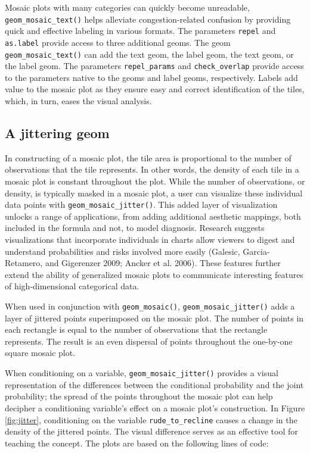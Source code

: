 Mosaic plots with many categories can quickly become unreadable, \texttt{geom\_mosaic\_text()} helps alleviate congestion-related confusion by providing quick and effective labeling in various formats. The parameters \texttt{repel} and \texttt{as.label} provide access to three additional geoms. The geom \texttt{geom\_mosaic\_text()} can add the text geom, the label geom, the  text geom, or the  label geom. The parameters \texttt{repel\_params} and \texttt{check\_overlap} provide access to the parameters native to the  geoms and label geoms, respectively. Labels add value to the mosaic plot as they ensure easy and correct identification of the tiles, which, in turn, eases the visual analysis.

\hypertarget{a-jittering-geom}{%
\subsection{A jittering geom}\label{a-jittering-geom}}

In constructing of a mosaic plot, the tile area is proportional to the number of observations that the tile represents. In other words, the density of each tile in a mosaic plot is constant throughout the plot. While the number of observations, or density, is typically masked in a mosaic plot, a user can visualize these individual data points with \texttt{geom\_mosaic\_jitter()}. This added layer of visualization unlocks a range of applications, from adding additional aesthetic mappings, both included in the formula and not, to model diagnosis. Research suggests visualizations that incorporate individuals in charts allow viewers to digest and understand probabilities and risks involved more easily (Galesic, Garcia-Retamero, and Gigerenzer 2009; Ancker et al. 2006). These features further extend the ability of generalized mosaic plots to communicate interesting features of high-dimensional categorical data.

When used in conjunction with \texttt{geom\_mosaic()}, \texttt{geom\_mosaic\_jitter()} adds a layer of jittered points superimposed on the mosaic plot. The number of points in each rectangle is equal to the number of observations that the rectangle represents. The result is an even dispersal of points throughout the one-by-one square mosaic plot.

When conditioning on a variable, \texttt{geom\_mosaic\_jitter()} provides a visual representation of the differences between the conditional probability and the joint probability; the spread of the points throughout the mosaic plot can help decipher a conditioning variable's effect on a mosaic plot's construction. In Figure \ref{fig:jitter}, conditioning on the variable \texttt{rude\_to\_recline} causes a change in the density of the jittered points. The visual difference serves as an effective tool for teaching the concept. The plots are based on the following lines of code:

